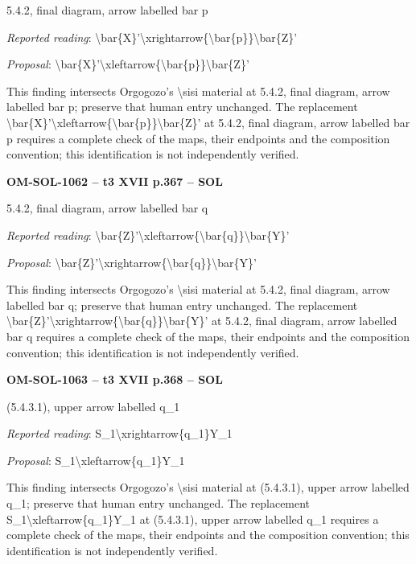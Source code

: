 5.4.2, final diagram, arrow labelled bar p\par
\emph{Reported reading}: \textbackslash{}bar\{X\}'\textbackslash{}xrightarrow\{\textbackslash{}bar\{p\}\}\textbackslash{}bar\{Z\}'\par
\emph{Proposal}: \textbackslash{}bar\{X\}'\textbackslash{}xleftarrow\{\textbackslash{}bar\{p\}\}\textbackslash{}bar\{Z\}'\par
This finding intersects Orgogozo's \textbackslash{}sisi material at 5.4.2, final diagram, arrow labelled bar p; preserve that human entry unchanged. The replacement \textbackslash{}bar\{X\}'\textbackslash{}xleftarrow\{\textbackslash{}bar\{p\}\}\textbackslash{}bar\{Z\}' at 5.4.2, final diagram, arrow labelled bar p requires a complete check of the maps, their endpoints and the composition convention; this identification is not independently verified.\par
\par\noindent\textbf{OM-SOL-1062 -- t3 XVII p.367 -- SOL}\par
5.4.2, final diagram, arrow labelled bar q\par
\emph{Reported reading}: \textbackslash{}bar\{Z\}'\textbackslash{}xleftarrow\{\textbackslash{}bar\{q\}\}\textbackslash{}bar\{Y\}'\par
\emph{Proposal}: \textbackslash{}bar\{Z\}'\textbackslash{}xrightarrow\{\textbackslash{}bar\{q\}\}\textbackslash{}bar\{Y\}'\par
This finding intersects Orgogozo's \textbackslash{}sisi material at 5.4.2, final diagram, arrow labelled bar q; preserve that human entry unchanged. The replacement \textbackslash{}bar\{Z\}'\textbackslash{}xrightarrow\{\textbackslash{}bar\{q\}\}\textbackslash{}bar\{Y\}' at 5.4.2, final diagram, arrow labelled bar q requires a complete check of the maps, their endpoints and the composition convention; this identification is not independently verified.\par
\par\noindent\textbf{OM-SOL-1063 -- t3 XVII p.368 -- SOL}\par
(5.4.3.1), upper arrow labelled q\_1\par
\emph{Reported reading}: S\_1\textbackslash{}xrightarrow\{q\_1\}Y\_1\par
\emph{Proposal}: S\_1\textbackslash{}xleftarrow\{q\_1\}Y\_1\par
This finding intersects Orgogozo's \textbackslash{}sisi material at (5.4.3.1), upper arrow labelled q\_1; preserve that human entry unchanged. The replacement S\_1\textbackslash{}xleftarrow\{q\_1\}Y\_1 at (5.4.3.1), upper arrow labelled q\_1 requires a complete check of the maps, their endpoints and the composition convention; this identification is not independently verified.\par
